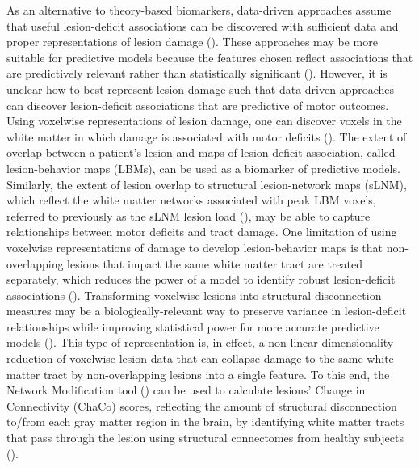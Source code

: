 \documentclass[10pt]{article}
\begin{document}
As an alternative to theory-based biomarkers, data-driven approaches assume that useful lesion-deficit associations can be discovered with sufficient data and proper representations of lesion damage (\cite{Kasties2021-rm, Bourached2022-vz, }). These approaches may be more suitable for predictive models because the features chosen reflect associations that are predictively relevant rather than statistically significant (\cite{Bzdok2020-py}). However, it is unclear how to best represent lesion damage such that data-driven approaches can discover lesion-deficit associations that are predictive of motor outcomes. Using voxelwise representations of lesion damage, one can discover voxels in the white matter in which damage is associated with motor deficits (\cite{Bowren2022-rs}). The extent of overlap between a patient's lesion and maps of lesion-deficit association, called lesion-behavior maps (LBMs), can be used as a biomarker of predictive models. Similarly, the extent of lesion overlap to structural lesion-network maps (sLNM), which reflect the white matter networks associated with peak LBM voxels, referred to previously as the sLNM lesion load (\cite{Bowren2022-rs}), may be able to capture relationships between motor deficits and tract damage. One limitation of using voxelwise representations of damage to develop lesion-behavior maps is that non-overlapping lesions that impact the same white matter tract are treated separately, which reduces the power of a model to identify robust lesion-deficit associations (\cite{Sperber2022-oj}). Transforming voxelwise lesions into structural disconnection measures may be a biologically-relevant way to preserve variance in lesion-deficit relationships while improving statistical power for more accurate predictive models (\cite{Sperber2022-oj}). This type of representation is, in effect, a non-linear dimensionality reduction of voxelwise lesion data that can collapse damage to the same white matter tract by non-overlapping lesions into a single feature. To this end, the Network Modification tool (\cite{Kuceyeski2013-nk}) can be used to calculate lesions' Change in Connectivity (ChaCo) scores, reflecting the amount of structural disconnection to/from each gray matter region in the brain, by identifying white matter tracts that pass through the lesion using structural connectomes from healthy subjects (\cite{Kuceyeski2013-nk, Kuceyeski2016-vj, Salvalaggio2020-pe, Griffis2019-cy, Sperber2022-oj}).
 
\end{document}

